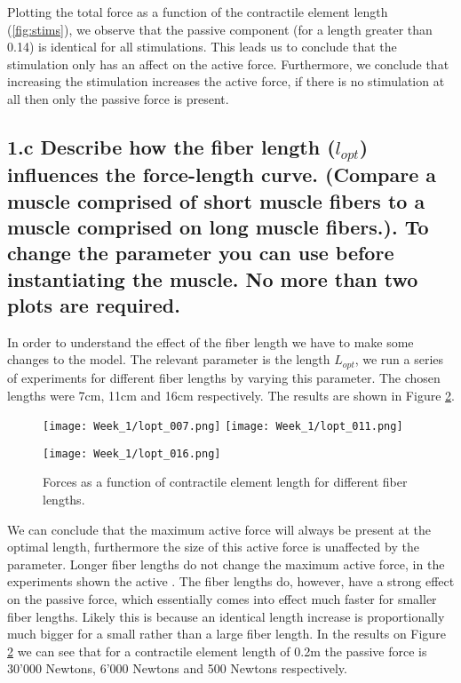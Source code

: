 \documentclass[11pt]{article}
\begin{document}
\begin{flushleft} Plotting the total force as a function of the contractile element length (\ref{fig:stims}), we observe that the passive component (for a length greater than 0.14) is identical for all stimulations. This leads us to conclude that the stimulation only has an affect on the active force. Furthermore, we conclude that increasing the stimulation increases the active force, if there is no stimulation at all then only the passive force is present. 
\end{flushleft}

\subsection*{1.c Describe how the fiber length ($l_{opt}$) influences
  the force-length curve.  (Compare a muscle comprised of short muscle
  fibers to a muscle comprised on long muscle fibers.). To change the
  parameter you can use
   before
  instantiating the muscle. No more than two plots are required. }
  
In order to understand the effect of the fiber length we have to make some changes to the model. The relevant parameter is the length \(L_{opt}\), we run a series of experiments for different fiber lengths by varying this parameter. The chosen lengths were 7cm, 11cm and 16cm respectively. The results are shown in Figure \ref{fig:lopt}.

\begin{figure}[!h]

\centering
{}
\texttt{[image: Week\_1/lopt\_007.png]}
\endminipage\hfill
{}
\vspace{0.5cm}
\texttt{[image: Week\_1/lopt\_011.png]}
\label{fig:simul_dyn_passive}
\endminipage\hfill 
\end{figure}

\begin{figure}[!h]
\centering
\texttt{[image: Week\_1/lopt\_016.png]}
\caption{Forces as a function of contractile element length for different fiber lengths.}
\label{fig:lopt}
\end{figure}

\newpage
We can conclude that the maximum active force will always be present at the optimal length, furthermore the size of this active force is unaffected by the parameter. Longer fiber lengths do not change the maximum active force, in the experiments shown the active . The fiber lengths do, however, have a strong effect on the passive force, which essentially comes into effect much faster for smaller fiber lengths. Likely this is because an identical length increase is proportionally much bigger for a small rather than a large fiber length. In the results on Figure \ref{fig:lopt}
we can see that for a contractile element length of 0.2m the passive force is 30'000 Newtons, 6'000 Newtons and 500 Newtons respectively. 
\end{document}
